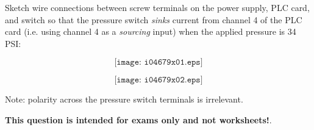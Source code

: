 

Sketch wire connections between screw terminals on the power supply, PLC card, and switch so that the pressure switch {\it sinks} current from channel 4 of the PLC card (i.e. using channel 4 as a {\it sourcing} input) when the applied pressure is 34 PSI:

$$\texttt{[image: i04679x01.eps]}$$







$$\texttt{[image: i04679x02.eps]}$$

Note: polarity across the pressure switch terminals is irrelevant.







{\bf This question is intended for exams only and not worksheets!}.


